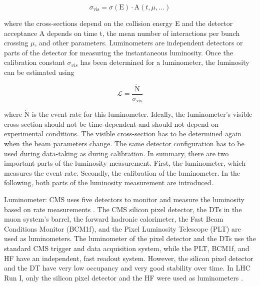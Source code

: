 \begin{equation}
  \sigma_{\mathrm{vis}}=\sigma(\mathrm{E}) \cdot \mathrm{A}(t, \mu, \ldots)
\end{equation}

where the cross-sections depend on the collision energy E and the detector acceptance A depends on time t, the mean number of interactions per bunch crossing $\mu$, and other parameters. Luminometers are independent detectors or parts of the detector for measuring the instantaneous luminosity. Once the calibration constant $\sigma_{vis}$ has been determined for a luminometer, the luminosity can be estimated using

\begin{equation}
  \mathcal{L}=\frac{\dot{\mathrm{N}}}{\sigma_{\mathrm{vis}}}
\end{equation}

where $\dot{\mathrm{N}}$ is the event rate for this luminometer. Ideally, the luminometer's visible cross-section should not be time-dependent and should not depend on experimental conditions. The visible cross-section has to be determined again when the beam parameters change. The same detector configuration has to be used during data-taking as during calibration. In summary, there are two important parts of the luminosity measurement. First, the luminometer, which measures the event rate. Secondly, the calibration of the luminometer. In the following, both parts of the luminosity measurement are introduced.

Luminometer: CMS uses five detectors to monitor and measure the luminosity based on rate measurements \cite{CMS:2019jhq, CMS:2018elu, CMS:2017sdi}. The CMS silicon pixel detector, the DTs in the muon system's barrel, the forward hadronic calorimeter, the Fast Beam Conditions Monitor (BCM1f), and the Pixel Luminosity Telescope (PLT) are used as luminometers. The luminometer of the pixel detector and the DTs use the standard CMS trigger and data acquisition system, while the PLT, BCM1f, and HF have an independent, fast readout system. However, the silicon pixel detector and the DT have very low occupancy and very good stability over time. In LHC Run I, only the silicon pixel detector and the HF were used as luminometers \cite{CMS:2013gfa}.

